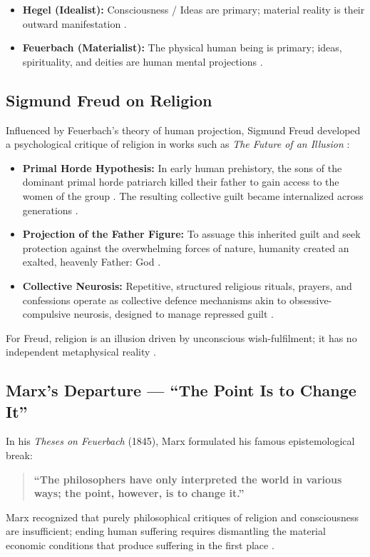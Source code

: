 \begin{ComparisonBox}
\begin{itemize}
    \item \textbf{Hegel (Idealist):} Consciousness / Ideas are primary; material reality is their outward manifestation .
    \item \textbf{Feuerbach (Materialist):} The physical human being is primary; ideas, spirituality, and deities are human mental projections .
\end{itemize}
\end{ComparisonBox}

\subsection{Sigmund Freud on Religion}

Influenced by Feuerbach's theory of human projection, Sigmund Freud developed a psychological critique of religion in works such as \textit{The Future of an Illusion} :
\begin{itemize}
    \item \textbf{Primal Horde Hypothesis:} In early human prehistory, the sons of the dominant primal horde patriarch killed their father to gain access to the women of the group . The resulting collective guilt became internalized across generations .
    \item \textbf{Projection of the Father Figure:} To assuage this inherited guilt and seek protection against the overwhelming forces of nature, humanity created an exalted, heavenly Father: God .
    \item \textbf{Collective Neurosis:} Repetitive, structured religious rituals, prayers, and confessions operate as collective defence mechanisms akin to obsessive-compulsive neurosis, designed to manage repressed guilt .
\end{itemize}

\begin{KeyConcept}
For Freud, religion is an illusion driven by unconscious wish-fulfilment; it has no independent metaphysical reality .
\end{KeyConcept}

\subsection{Marx's Departure --- ``The Point Is to Change It''}

\begin{CriticalPoint}
In his \textit{Theses on Feuerbach} (1845), Marx formulated his famous epistemological break:
\begin{quote}
\textbf{``The philosophers have only interpreted the world in various ways; the point, however, is to change it.''} 
\end{quote}
Marx recognized that purely philosophical critiques of religion and consciousness are insufficient; ending human suffering requires dismantling the material economic conditions that produce suffering in the first place .
\end{CriticalPoint}

